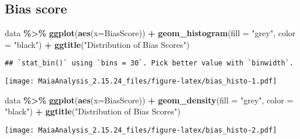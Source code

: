 \documentclass[
]{article}
\newenvironment{Shaded}{\begin{snugshade}}{\end{snugshade}}
\newcommand{\AttributeTok}[1]{\textcolor[rgb]{0.13,0.29,0.53}{#1}}
\newcommand{\FunctionTok}[1]{\textcolor[rgb]{0.13,0.29,0.53}{\textbf{#1}}}
\newcommand{\NormalTok}[1]{#1}
\newcommand{\SpecialCharTok}[1]{\textcolor[rgb]{0.81,0.36,0.00}{\textbf{#1}}}
\newcommand{\StringTok}[1]{\textcolor[rgb]{0.31,0.60,0.02}{#1}}
\begin{document}
\hypertarget{bias-score}{%
\subsection{Bias score}\label{bias-score}}

\begin{Shaded}
\begin{Highlighting}[]
\NormalTok{data }\SpecialCharTok{\%\textgreater{}\%}
  \FunctionTok{ggplot}\NormalTok{(}\FunctionTok{aes}\NormalTok{(}\AttributeTok{x=}\NormalTok{BiasScore)) }\SpecialCharTok{+}
  \FunctionTok{geom\_histogram}\NormalTok{(}\AttributeTok{fill =} \StringTok{"grey"}\NormalTok{, }\AttributeTok{color =} \StringTok{"black"}\NormalTok{) }\SpecialCharTok{+}
  \FunctionTok{ggtitle}\NormalTok{(}\StringTok{"Distribution of Bias Scores"}\NormalTok{)}
\end{Highlighting}
\end{Shaded}

\begin{verbatim}
## `stat_bin()` using `bins = 30`. Pick better value with `binwidth`.
\end{verbatim}

\texttt{[image: MaiaAnalysis\_2.15.24\_files/figure-latex/bias\_histo-1.pdf]}

\begin{Shaded}
\begin{Highlighting}[]
\NormalTok{data }\SpecialCharTok{\%\textgreater{}\%}
  \FunctionTok{ggplot}\NormalTok{(}\FunctionTok{aes}\NormalTok{(}\AttributeTok{x=}\NormalTok{BiasScore)) }\SpecialCharTok{+}
  \FunctionTok{geom\_density}\NormalTok{(}\AttributeTok{fill =} \StringTok{"grey"}\NormalTok{, }\AttributeTok{color =} \StringTok{"black"}\NormalTok{) }\SpecialCharTok{+}
  \FunctionTok{ggtitle}\NormalTok{(}\StringTok{"Distribution of Bias Scores"}\NormalTok{)}
\end{Highlighting}
\end{Shaded}

\texttt{[image: MaiaAnalysis\_2.15.24\_files/figure-latex/bias\_histo-2.pdf]}
\end{document}
